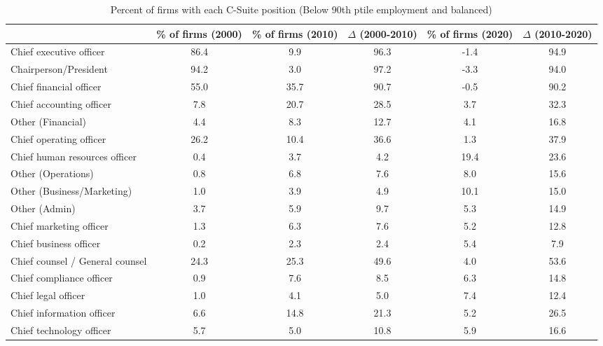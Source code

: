 \begin{table}[htbp]\centering
\caption{Percent of firms with each C-Suite position (Below 90th ptile employment and balanced)\label{tab98}}
\begin{tabular}{l*{5}{c}}
\toprule
                    &\% of firms (2000)&\% of firms (2010)&$\Delta$ (2000-2010)&\% of firms (2020)&$\Delta$ (2010-2020)\\
\midrule
Chief executive officer&        86.4&         9.9&        96.3&        -1.4&        94.9\\
Chairperson/President&        94.2&         3.0&        97.2&        -3.3&        94.0\\
Chief financial officer&        55.0&        35.7&        90.7&        -0.5&        90.2\\
Chief accounting officer&         7.8&        20.7&        28.5&         3.7&        32.3\\
Other (Financial)   &         4.4&         8.3&        12.7&         4.1&        16.8\\
Chief operating officer&        26.2&        10.4&        36.6&         1.3&        37.9\\
Chief human resources officer&         0.4&         3.7&         4.2&        19.4&        23.6\\
Other (Operations)  &         0.8&         6.8&         7.6&         8.0&        15.6\\
Other (Business/Marketing)&         1.0&         3.9&         4.9&        10.1&        15.0\\
Other (Admin)       &         3.7&         5.9&         9.7&         5.3&        14.9\\
Chief marketing officer&         1.3&         6.3&         7.6&         5.2&        12.8\\
Chief business officer&         0.2&         2.3&         2.4&         5.4&         7.9\\
Chief counsel / General counsel&        24.3&        25.3&        49.6&         4.0&        53.6\\
Chief compliance officer&         0.9&         7.6&         8.5&         6.3&        14.8\\
Chief legal officer &         1.0&         4.1&         5.0&         7.4&        12.4\\
Chief information officer&         6.6&        14.8&        21.3&         5.2&        26.5\\
Chief technology officer&         5.7&         5.0&        10.8&         5.9&        16.6\\

\end{tabular}
\end{table}
